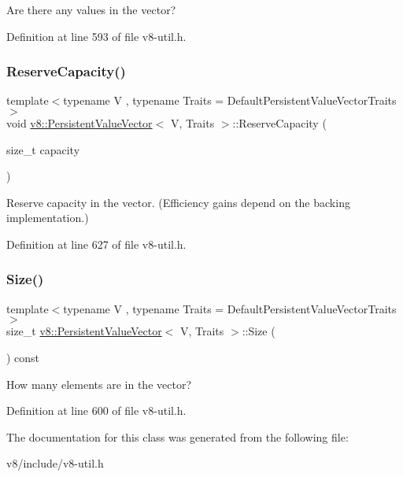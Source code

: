 Are there any values in the vector? 

Definition at line 593 of file v8-\/util.\+h.

\mbox{\label{classv8_1_1PersistentValueVector_ad4cccfee3a275986578276efe0c78510}} 
\subsubsection{\texorpdfstring{Reserve\+Capacity()}{ReserveCapacity()}}
{\footnotesize\ttfamily template$<$typename V , typename Traits  = Default\+Persistent\+Value\+Vector\+Traits$>$ \\
void \mbox{\hyperlink{classv8_1_1PersistentValueVector}{v8\+::\+Persistent\+Value\+Vector}}$<$ V, Traits $>$\+::Reserve\+Capacity (\begin{DoxyParamCaption}\item[{size\+\_\+t}]{capacity }\end{DoxyParamCaption})\hspace{0.3cm}{\ttfamily [inline]}}

Reserve capacity in the vector. (Efficiency gains depend on the backing implementation.) 

Definition at line 627 of file v8-\/util.\+h.

\mbox{\label{classv8_1_1PersistentValueVector_adf4e13701de97acc753ca294c66b9f35}} 
\subsubsection{\texorpdfstring{Size()}{Size()}}
{\footnotesize\ttfamily template$<$typename V , typename Traits  = Default\+Persistent\+Value\+Vector\+Traits$>$ \\
size\+\_\+t \mbox{\hyperlink{classv8_1_1PersistentValueVector}{v8\+::\+Persistent\+Value\+Vector}}$<$ V, Traits $>$\+::Size (\begin{DoxyParamCaption}{ }\end{DoxyParamCaption}) const\hspace{0.3cm}{\ttfamily [inline]}}

How many elements are in the vector? 

Definition at line 600 of file v8-\/util.\+h.



The documentation for this class was generated from the following file\+:\begin{DoxyCompactItemize}
\item 
v8/include/v8-\/util.\+h\end{DoxyCompactItemize}
